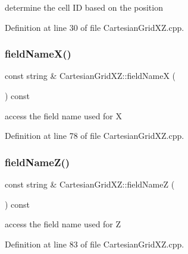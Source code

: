 determine the cell ID based on the position 



Definition at line 30 of file Cartesian\+Grid\+X\+Z.\+cpp.

\hypertarget{class_d_d4hep_1_1_geometry_1_1_cartesian_grid_x_z_a998e829705c38ce261ec90925d9bf15c}{}\label{class_d_d4hep_1_1_geometry_1_1_cartesian_grid_x_z_a998e829705c38ce261ec90925d9bf15c} 
\subsubsection{\texorpdfstring{field\+Name\+X()}{fieldNameX()}}
{\footnotesize\ttfamily const string \& Cartesian\+Grid\+X\+Z\+::field\+NameX (\begin{DoxyParamCaption}{ }\end{DoxyParamCaption}) const}



access the field name used for X 



Definition at line 78 of file Cartesian\+Grid\+X\+Z.\+cpp.

\hypertarget{class_d_d4hep_1_1_geometry_1_1_cartesian_grid_x_z_ac70fd7f9219dc5c3f0c6a4aab61485e4}{}\label{class_d_d4hep_1_1_geometry_1_1_cartesian_grid_x_z_ac70fd7f9219dc5c3f0c6a4aab61485e4} 
\subsubsection{\texorpdfstring{field\+Name\+Z()}{fieldNameZ()}}
{\footnotesize\ttfamily const string \& Cartesian\+Grid\+X\+Z\+::field\+NameZ (\begin{DoxyParamCaption}{ }\end{DoxyParamCaption}) const}



access the field name used for Z 



Definition at line 83 of file Cartesian\+Grid\+X\+Z.\+cpp.

